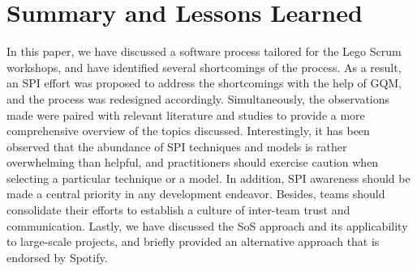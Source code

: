 \documentclass[conference]{IEEEtran}
\begin{document}
\section{Summary and Lessons Learned}
\label{sec:summary}
In this paper, we have discussed a software process tailored for the Lego Scrum
workshops, and have identified several shortcomings of the process. As a
result, an SPI effort was proposed to address the shortcomings with the help of
GQM, and the process was redesigned accordingly. Simultaneously, the
observations made were paired with relevant literature and studies to provide a
more comprehensive overview of the topics discussed. Interestingly, it has been
observed that the abundance of SPI techniques and models is rather overwhelming
than helpful, and practitioners should exercise caution when selecting a
particular technique or a model. In addition, SPI awareness should be made a
central priority in any development endeavor. Besides, teams should consolidate
their efforts to establish a culture of inter-team trust and communication.
Lastly, we have discussed the SoS approach and its applicability to large-scale
projects, and briefly provided an alternative approach that is endorsed by
Spotify.



\end{document}
